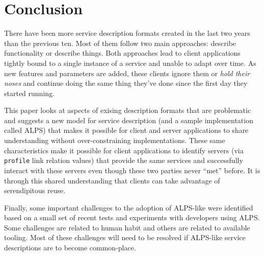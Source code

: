 \documentclass{wsrest2014}
\begin{document}
\section{Conclusion}
\label{_conclusion}
 \par{}There have been more service description formats created in the last two years than the previous ten. Most of them follow two main approaches: describe functionality or describe things. Both approaches lead to client applications tightly bound to a single instance of a service and unable to adapt over time. As new features and parameters are added, these clients ignore them or \emph{hold their noses} and continue doing the same thing they've done since the first day they started running.
 \par{}This paper looks at aspects of exising description formats that are problematic and suggests a new model for service description (and a sample implementation called ALPS) that makes it possible for client and server applications to share understanding without over-constraining implementations. These same characteristics make it possible for client applications to identify servers (via \texttt{profile} link relation values) that provide the same services and successfully interact with these servers even though these two parties never ``met'' before. It is through this shared understanding that clients can take advantage of \textquotedbl{}serendipitous reuse.\textquotedbl{}
 \par{}Finally, some important challenges to the adoption of ALPS-like were identified based on a small set of recent tests and experiments with developers using ALPS. Some challenges are related to human habit and others are related to available tooling. Most of these challenges will need to be resolved if ALPS-like service descriptions are to become common-place.
\hypertarget{_bibliography}{}
\end{document}

